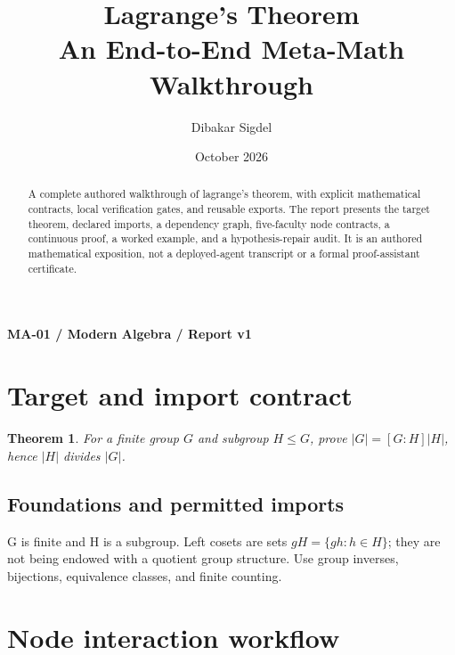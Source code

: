 \documentclass[preprint,12pt,aps,pra,showkeys,amsmath,amssymb,superscriptaddress,floatfix]{revtex4-2}
\newtheorem{theorem}{Theorem}[section]
\theoremstyle{definition}
\theoremstyle{remark}
\begin{document}
\title{Lagrange's Theorem\\[4pt]\large An End-to-End Meta-Math Walkthrough}

\author{Dibakar Sigdel}


\date{October 2026}

\begin{abstract}

A complete authored walkthrough of lagrange's theorem, with explicit
mathematical contracts, local verification gates, and reusable exports.
The report presents the target theorem, declared imports, a dependency
graph, five-faculty node contracts, a continuous proof, a worked
example, and a hypothesis-repair audit. It is an authored mathematical
exposition, not a deployed-agent transcript or a formal proof-assistant
certificate.

\end{abstract}\maketitle\linespread{1.12}\selectfont

\noindent\textbf{MA-01 / Modern Algebra / Report v1}

\section{Target and import contract}

\begin{theorem}

For a finite group \(G\) and subgroup \(H\le G\), prove
\(|G|=[G:H]|H|\), hence \(|H|\) divides \(|G|\).

\end{theorem}

\subsection{Foundations and permitted imports}

G is finite and H is a subgroup. Left cosets are sets
\(gH=\{gh:h\in H\}\); they are not being endowed with a quotient group
structure. Use group inverses, bijections, equivalence classes, and
finite counting.

\clearpage\section{Node interaction workflow}
\end{document}
